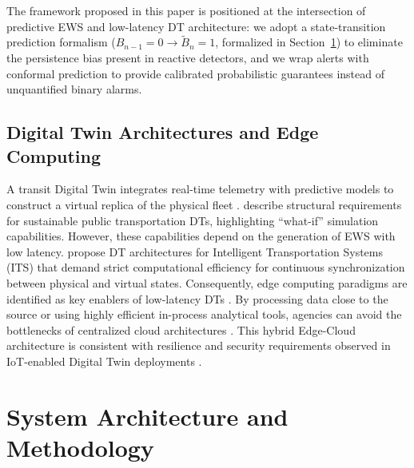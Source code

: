 \documentclass[fleqn,10pt,lineno]{wlpeerj}
\begin{document}
The framework proposed in this paper is positioned at the intersection of predictive EWS and
low-latency DT architecture: we adopt a state-transition prediction formalism
($B_{n-1}=0 \rightarrow \tilde{B}_n=1$, formalized in Section~\ref{sec:methodology}) to eliminate the
persistence bias present in reactive detectors, and we wrap alerts with conformal prediction to
provide calibrated probabilistic guarantees instead of unquantified binary alarms.

\subsection{Digital Twin Architectures and Edge Computing}

A transit Digital Twin integrates real-time telemetry with predictive models to construct a
virtual replica of the physical fleet \citep{22,23}. \citet{24} describe structural requirements
for sustainable public transportation DTs, highlighting ``what-if'' simulation capabilities.
However, these capabilities depend on the generation of EWS with low latency.
\citet{25} propose DT architectures for Intelligent Transportation Systems (ITS) that demand
strict computational efficiency for continuous synchronization between physical and virtual
states. Consequently, edge computing paradigms are identified as key enablers of low-latency
DTs \citep{26}. By processing data close to the source or using highly efficient in-process
analytical tools, agencies can avoid the bottlenecks of centralized cloud architectures
\citep{27}. This hybrid Edge-Cloud architecture is consistent with resilience and security requirements
observed in IoT-enabled Digital Twin deployments \citep{31}.

\section{System Architecture and Methodology}
\label{sec:methodology}
\end{document}
